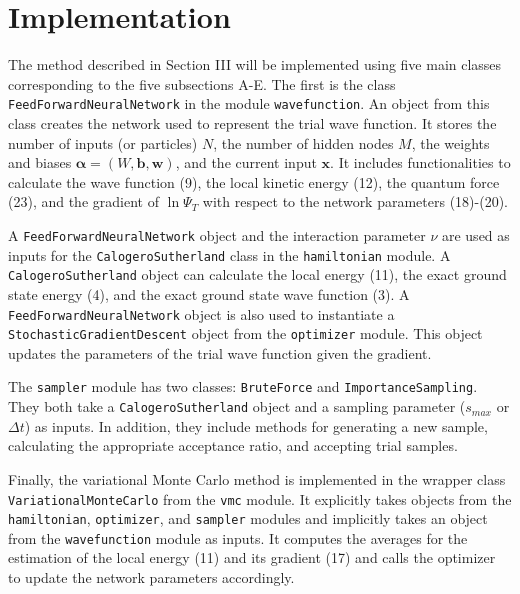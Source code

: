 \documentclass[prb,aps,twocolumn,showpacs,10pt]{revtex4-1}
\begin{document}

\section{Implementation}

The method described in Section III will be implemented using five main classes corresponding to the five subsections A-E. The first is the class \texttt{FeedForwardNeuralNetwork} in the module \texttt{wavefunction}. An object from this class creates the network used to represent the trial wave function. It stores the number of inputs (or particles) $N$, the number of hidden nodes $M$, the weights and biases $\bm{\alpha} = (W, \bm{b}, \bm{w})$, and the current input $\bm{x}$. It includes functionalities to calculate the wave function (9), the local kinetic energy (12), the quantum force (23), and the gradient of $\ln \Psi_T$ with respect to the network parameters (18)-(20).

A \texttt{FeedForwardNeuralNetwork} object and the interaction parameter $\nu$ are used as inputs for the \texttt{CalogeroSutherland} class in the \texttt{hamiltonian} module. A \texttt{CalogeroSutherland} object can calculate the local energy (11), the exact ground state energy (4), and the exact ground state wave function (3). A \texttt{FeedForwardNeuralNetwork} object is also used to instantiate a \texttt{StochasticGradientDescent} object from the \texttt{optimizer} module. This object updates the parameters of the trial wave function given the gradient. 

The \texttt{sampler} module has two classes: \texttt{BruteForce} and \texttt{ImportanceSampling}. They both take a \texttt{CalogeroSutherland} object and a sampling parameter ($s_{max}$ or $\Delta t$) as inputs. In addition, they include methods for generating a new sample, calculating the appropriate acceptance ratio, and accepting trial samples. 

Finally, the variational Monte Carlo method is implemented in the wrapper class \texttt{VariationalMonteCarlo} from the \texttt{vmc} module. It explicitly takes objects from the \texttt{hamiltonian}, \texttt{optimizer}, and \texttt{sampler} modules and implicitly takes an object from the \texttt{wavefunction} module as inputs. It computes the averages for the estimation of the local energy (11) and its gradient (17) and calls the optimizer to update the network parameters accordingly.
\end{document}
